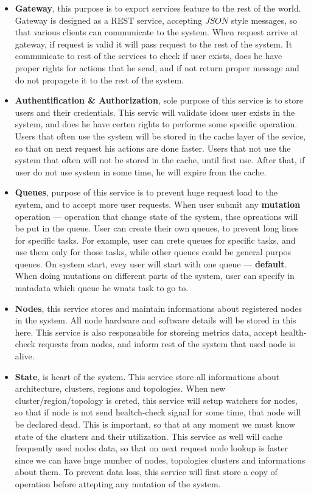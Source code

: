 \begin{itemize}
	\item \textbf{Gateway}, this purpose is to export services feature to the rest of the world. Gateway is designed as a REST service, accepting $JSON$ style messages, so that various clients can communicate to the system. When request arrive at gateway, if request is valid it will pass request to the rest of the system. It communicate to rest of the services to check if user exists, does he have proper rights for actions that he send, and if not return proper message and do not propagete it to the rest of the system.
	\item \textbf{Authentification \& Authorization}, sole purpose of this service is to store users and their credentials. This servic will validate idoes user exists in the system, and does he have certen rights to performe some specific operation. Users that often use the system will be stored in the cache layer of the sevice, so that on next request his actions are done faster. Users that not use the system that often will not be stored in the cache, until first use. After that, if user do not use system in some time, he will expire from the cache.
	\item \textbf{Queues}, purpose of this service is to prevent huge request load to the system, and to accept more user requests. When user submit any \textbf{mutation} operation --- operation that change state of the system, thse opreations will be put in the queue. User can create their own queues, to prevent long lines for specific tasks. For example, user can crete queues for specific tasks, and use them only for those tasks, while other queues could be general purpos queues. On system start, evey user will start with one queue --- \textbf{default}. When doing mutations on different parts of the system, user can specify in matadata which queue he wnats task to go to.
	\item \textbf{Nodes}, this service stores and maintain informations about registered nodes in the system. All node hardware and software details will be stored in this here. This service is also responsabile for storeing metrics data, accept health-check requests from nodes, and inform rest of the system that used node is alive.
	\item \textbf{State}, is heart of the system. This service store all informations about architecture, clusters, regions and topologies. When new cluster/region/topology is creted, this service will setup watchers for nodes, so that if node is not send healtch-check signal for some time, that node will be declared dead. This is important, so that at any moment we must know state of the clusters and their utilization. This service as well will cache frequently used nodes data, so that on next request node lookup is faster since we can have huge number of nodes, topologies clusters and informations about them. To prevent data loss, this service will first store a copy of operation before attepting any mutation of the system.

\end{itemize}

